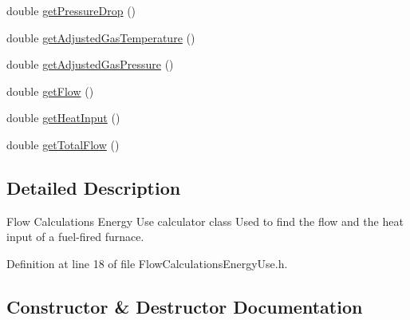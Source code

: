 \begin{DoxyCompactItemize}
\item 
double \hyperlink{class_flow_calculations_energy_use_a35aa80b2b9ea8769d56bf9e8d5837927}{get\+Pressure\+Drop} ()
\item 
double \hyperlink{class_flow_calculations_energy_use_a6efdcd6364e01577dda38dc49601df53}{get\+Adjusted\+Gas\+Temperature} ()
\item 
double \hyperlink{class_flow_calculations_energy_use_a8633821730568a5b1449914060c52aad}{get\+Adjusted\+Gas\+Pressure} ()
\item 
double \hyperlink{class_flow_calculations_energy_use_a6b892e984bd09e821cb642f8f8efd221}{get\+Flow} ()
\item 
double \hyperlink{class_flow_calculations_energy_use_af2d2196911d4784d72b14dff83295b19}{get\+Heat\+Input} ()
\item 
double \hyperlink{class_flow_calculations_energy_use_a154ce8f8307b443366b99719987dd725}{get\+Total\+Flow} ()
\end{DoxyCompactItemize}


\subsection{Detailed Description}
Flow Calculations Energy Use calculator class Used to find the flow and the heat input of a fuel-\/fired furnace. 

Definition at line 18 of file Flow\+Calculations\+Energy\+Use.\+h.



\subsection{Constructor \& Destructor Documentation}
\mbox{\label{class_flow_calculations_energy_use_a37514554d3cb04764b27d648966de471}} 
